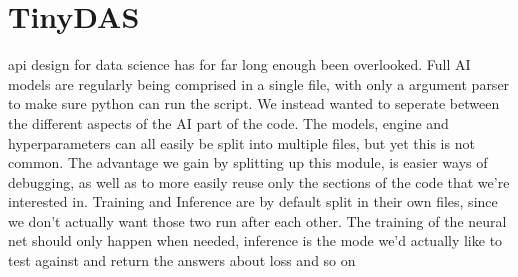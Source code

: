 \section{TinyDAS}
\label{disc:tinydas}

api design for data science has for far long enough been overlooked. Full AI models are regularly being comprised in a single file, with only a argument parser to make sure python can run the script. We instead wanted to seperate between the different aspects of the AI part of the code. The models, engine and hyperparameters can all easily be split into multiple files, but yet this is not common. The advantage we gain by splitting up this module, is easier ways of debugging, as well as to more easily reuse only the sections of the code that we're interested in. Training and Inference are by default split in their own files, since we don't actually want those two run after each other. The training of the neural net should only happen when needed, inference is the mode we'd actually like to test against and return the answers about loss and so on 